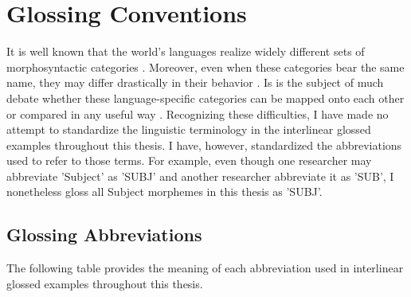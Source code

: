 \chapter{Glossing Conventions}

It is well known that the world's languages realize widely different sets of morphosyntactic categories . Moreover, even when these categories bear the same name, they may differ drastically in their behavior . Is is the subject of much debate whether these language-specific categories can be mapped onto each other or compared in any useful way . Recognizing these difficulties, I have made no attempt to standardize the linguistic terminology in the interlinear glossed examples throughout this thesis. I have, however, standardized the abbreviations used to refer to those terms. For example, even though one researcher may abbreviate 'Subject' as 'SUBJ' and another researcher abbreviate it as 'SUB', I nonetheless gloss all Subject morphemes in this thesis as 'SUBJ'.

\section{Glossing Abbreviations}

The following table provides the meaning of each abbreviation used in interlinear glossed examples throughout this thesis.

